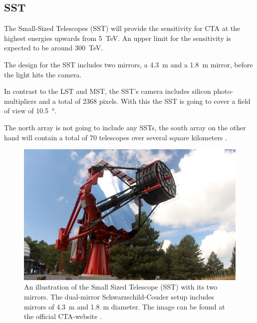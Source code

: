 \subsection{SST}
The Small-Sized Telescopes (SST) will provide the sensitivity for CTA at the 
highest energies upwards from \SI{5}{\tera\electronvolt}.
An upper limit for the sensitivity is expected to be around \SI{300}{\tera\electronvolt}.

The design for the SST includes two mirrors, a \SI{4.3}{\meter} and a \SI{1.8}{\meter}
mirror, before the light hits the camera.

In contrast to the LST and MST, the SST's camera includes silicon photo-multipliers
and a total of 2368 pixels. With this the SST is going to cover a field of view 
of \SI{10.5}{\degree}.

The north array is not going to include any SSTs, the 
south array on the other hand will contain a total of 70 telescopes over
several square kilometers \cite{cta_web}.

\begin{figure}
	\center
	\captionsetup{width=0.9\linewidth}
	\includegraphics[width=.9\textwidth]{images/sst.jpg}
	\caption{An illustration of the Small Sized Telescope (SST) with its
	two mirrors.
	The dual-mirror Schwarzschild-Couder setup includes mirrors of
	\SI{4.3}{\meter} and \SI{1.8}{\meter} diameter.
	The image can be found at the official CTA-website \cite{cta_web}.}
	\label{fig:sst}
\end{figure}
